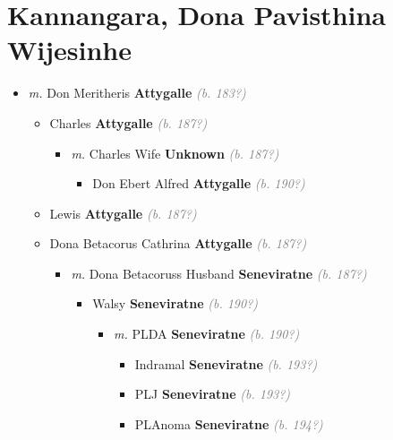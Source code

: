 \documentclass[10pt, openany]{book}
\begin{document}
\chapter{Kannangara, Dona Pavisthina Wijesinhe}
\label{00000426}
\textcolor{slmaroon}{\textit{}}
\begin{itemize}
\item{\textit{m.} Don Meritheris \textbf{Attygalle} \textcolor{gray}{\textit{(b. 183?)}}   \label{couple:00000098:00000426} \begin{itemize}
\item{Charles \textbf{Attygalle} \textcolor{gray}{\textit{(b. 187?)}}
\begin{itemize}
\item{\textit{m.} Charles Wife \textbf{Unknown} \textcolor{gray}{\textit{(b. 187?)}}   \label{couple:00000095:00000864} \begin{itemize}
\item{Don Ebert Alfred \textbf{Attygalle} \textcolor{gray}{\textit{(b. 190?)}}
   }
\end{itemize}}
\end{itemize}
 }
\item{Lewis \textbf{Attygalle} \textcolor{gray}{\textit{(b. 187?)}}
 }
\item{Dona Betacorus Cathrina \textbf{Attygalle} \textcolor{gray}{\textit{(b. 187?)}}
\begin{itemize}
\item{\textit{m.} Dona Betacoruss Husband \textbf{Seneviratne} \textcolor{gray}{\textit{(b. 187?)}}   \label{couple:00000101:00000821} \begin{itemize}
\item{Walsy \textbf{Seneviratne} \textcolor{gray}{\textit{(b. 190?)}}
\begin{itemize}
\item{\textit{m.} PLDA \textbf{Seneviratne} \textcolor{gray}{\textit{(b. 190?)}}   \label{couple:00000830:00000835} \begin{itemize}
\item{Indramal \textbf{Seneviratne} \textcolor{gray}{\textit{(b. 193?)}}
 }
\item{PLJ \textbf{Seneviratne} \textcolor{gray}{\textit{(b. 193?)}}
 }
\item{PLAnoma \textbf{Seneviratne} \textcolor{gray}{\textit{(b. 194?)}}
 }

\end{itemize}}
\end{itemize}}
\end{itemize}}
\end{itemize}}
\end{itemize}}
\end{itemize}
\end{document}
